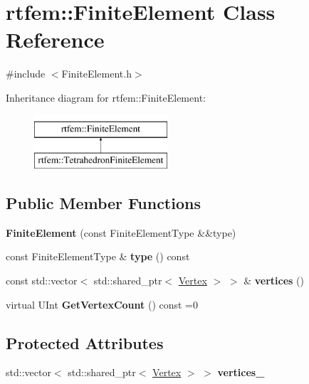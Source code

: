 \hypertarget{classrtfem_1_1FiniteElement}{}\section{rtfem\+:\+:Finite\+Element Class Reference}
\label{classrtfem_1_1FiniteElement}


{\ttfamily \#include $<$Finite\+Element.\+h$>$}

Inheritance diagram for rtfem\+:\+:Finite\+Element\+:\begin{figure}[H]
\begin{center}
\leavevmode
\includegraphics[height=2.000000cm]{classrtfem_1_1FiniteElement}
\end{center}
\end{figure}
\subsection*{Public Member Functions}
\begin{DoxyCompactItemize}
\item 
\mbox{\label{classrtfem_1_1FiniteElement_ad1fd028110f56384d5e7d3660699bdd2}} 
{\bfseries Finite\+Element} (const Finite\+Element\+Type \&\&type)
\item 
\mbox{\label{classrtfem_1_1FiniteElement_a5564187e7bd5d933517601ae2a67a7fd}} 
const Finite\+Element\+Type \& {\bfseries type} () const
\item 
\mbox{\label{classrtfem_1_1FiniteElement_a2b330c717adf34307bca11ccb6fc1876}} 
const std\+::vector$<$ std\+::shared\+\_\+ptr$<$ \hyperlink{classrtfem_1_1Vertex}{Vertex} $>$ $>$ \& {\bfseries vertices} ()
\item 
\mbox{\label{classrtfem_1_1FiniteElement_a87155114b3992082f3c719ec5e2ec322}} 
virtual U\+Int {\bfseries Get\+Vertex\+Count} () const =0
\end{DoxyCompactItemize}
\subsection*{Protected Attributes}
\begin{DoxyCompactItemize}
\item 
\mbox{\label{classrtfem_1_1FiniteElement_aa86ce90533ec663952e6d08890eae589}} 
std\+::vector$<$ std\+::shared\+\_\+ptr$<$ \hyperlink{classrtfem_1_1Vertex}{Vertex} $>$ $>$ {\bfseries vertices\+\_\+}
\end{DoxyCompactItemize}


